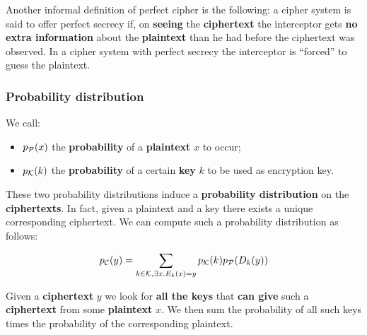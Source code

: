 Another informal definition of perfect cipher is the following: a cipher system is said to offer perfect secrecy if, on \textbf{seeing} the \textbf{ciphertext} the interceptor gets \textbf{no extra information} about the \textbf{plaintext} than he had before the ciphertext was observed. In a cipher system with perfect secrecy the interceptor is “forced” to guess the plaintext.

\subsubsection{Probability distribution}

We call:

\begin{itemize}
    \item $p_{\cal P}(x)$ the \textbf{probability} of a \textbf{plaintext} $x$ to occur;
    \item $p_{\cal K}(k)$ the \textbf{probability} of a certain \textbf{key} $k$ to be used as encryption key.
\end{itemize}

These two probability distributions induce a \textbf{probability distribution} on the \textbf{ciphertexts}. In fact, given a plaintext and a key there exists a unique corresponding ciphertext. We can compute such a probability distribution as follows:

$$
p_{\cal C}(y) = \displaystyle \sum_{k \in {\cal K}, \exists x . E_k(x)=y} {p_{\cal K}(k) p_{\cal P}(D_k(y))}
$$

Given a \textbf{ciphertext} $y$ we look for \textbf{all the keys} that \textbf{can give} such a \textbf{ciphertext} from some \textbf{plaintext} $x$. We then sum the probability of all such keys times the probability of the corresponding plaintext.


